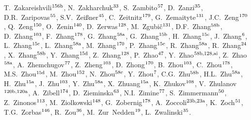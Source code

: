 \begin{flushleft}
T.~Zakareishvili$^\textrm{\scriptsize 156b}$,    
N.~Zakharchuk$^\textrm{\scriptsize 33}$,    
S.~Zambito$^\textrm{\scriptsize 57}$,    
D.~Zanzi$^\textrm{\scriptsize 35}$,    
D.R.~Zaripovas$^\textrm{\scriptsize 55}$,    
S.V.~Zei{\ss}ner$^\textrm{\scriptsize 45}$,    
C.~Zeitnitz$^\textrm{\scriptsize 179}$,    
G.~Zemaityte$^\textrm{\scriptsize 131}$,    
J.C.~Zeng$^\textrm{\scriptsize 170}$,    
Q.~Zeng$^\textrm{\scriptsize 150}$,    
O.~Zenin$^\textrm{\scriptsize 140}$,    
D.~Zerwas$^\textrm{\scriptsize 128}$,    
M.~Zgubi\v{c}$^\textrm{\scriptsize 131}$,    
D.F.~Zhang$^\textrm{\scriptsize 58b}$,    
D.~Zhang$^\textrm{\scriptsize 103}$,    
F.~Zhang$^\textrm{\scriptsize 178}$,    
G.~Zhang$^\textrm{\scriptsize 58a}$,    
G.~Zhang$^\textrm{\scriptsize 15b}$,    
H.~Zhang$^\textrm{\scriptsize 15c}$,    
J.~Zhang$^\textrm{\scriptsize 6}$,    
L.~Zhang$^\textrm{\scriptsize 15c}$,    
L.~Zhang$^\textrm{\scriptsize 58a}$,    
M.~Zhang$^\textrm{\scriptsize 170}$,    
P.~Zhang$^\textrm{\scriptsize 15c}$,    
R.~Zhang$^\textrm{\scriptsize 58a}$,    
R.~Zhang$^\textrm{\scriptsize 24}$,    
X.~Zhang$^\textrm{\scriptsize 58b}$,    
Y.~Zhang$^\textrm{\scriptsize 15d}$,    
Z.~Zhang$^\textrm{\scriptsize 128}$,    
P.~Zhao$^\textrm{\scriptsize 47}$,    
Y.~Zhao$^\textrm{\scriptsize 58b,128,ai}$,    
Z.~Zhao$^\textrm{\scriptsize 58a}$,    
A.~Zhemchugov$^\textrm{\scriptsize 77}$,    
Z.~Zheng$^\textrm{\scriptsize 103}$,    
D.~Zhong$^\textrm{\scriptsize 170}$,    
B.~Zhou$^\textrm{\scriptsize 103}$,    
C.~Zhou$^\textrm{\scriptsize 178}$,    
M.S.~Zhou$^\textrm{\scriptsize 15d}$,    
M.~Zhou$^\textrm{\scriptsize 152}$,    
N.~Zhou$^\textrm{\scriptsize 58c}$,    
Y.~Zhou$^\textrm{\scriptsize 7}$,    
C.G.~Zhu$^\textrm{\scriptsize 58b}$,    
H.L.~Zhu$^\textrm{\scriptsize 58a}$,    
H.~Zhu$^\textrm{\scriptsize 15a}$,    
J.~Zhu$^\textrm{\scriptsize 103}$,    
Y.~Zhu$^\textrm{\scriptsize 58a}$,    
X.~Zhuang$^\textrm{\scriptsize 15a}$,    
K.~Zhukov$^\textrm{\scriptsize 108}$,    
V.~Zhulanov$^\textrm{\scriptsize 120b,120a}$,    
A.~Zibell$^\textrm{\scriptsize 174}$,    
D.~Zieminska$^\textrm{\scriptsize 63}$,    
N.I.~Zimine$^\textrm{\scriptsize 77}$,    
S.~Zimmermann$^\textrm{\scriptsize 50}$,    
Z.~Zinonos$^\textrm{\scriptsize 113}$,    
M.~Ziolkowski$^\textrm{\scriptsize 148}$,    
G.~Zobernig$^\textrm{\scriptsize 178}$,    
A.~Zoccoli$^\textrm{\scriptsize 23b,23a}$,    
K.~Zoch$^\textrm{\scriptsize 51}$,    
T.G.~Zorbas$^\textrm{\scriptsize 146}$,    
R.~Zou$^\textrm{\scriptsize 36}$,    
M.~Zur~Nedden$^\textrm{\scriptsize 19}$,    
L.~Zwalinski$^\textrm{\scriptsize 35}$.    
\bigskip
\\


\end{flushleft}
